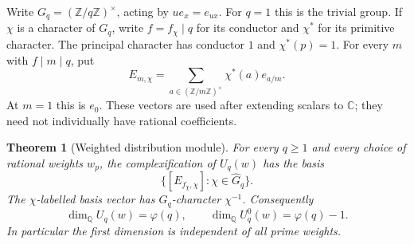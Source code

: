 \documentclass[11pt,a4paper]{article}
\newtheorem{theorem}{Theorem}[section]
\theoremstyle{definition}
\theoremstyle{remark}
\numberwithin{equation}{section}
\begin{document}
Write $G_q=(\mathbb Z/q\mathbb Z)^\times$, acting by $u e_x=e_{ux}$.
For $q=1$ this is the trivial group.  If $\chi$ is a character of $G_q$,
write $f=f_\chi\mid q$ for its conductor and $\chi^*$ for its primitive
character.  The principal character has conductor $1$ and
$\chi^*(p)=1$.  For every $m$ with $f\mid m\mid q$, put
\begin{equation}\label{rank:E}
 E_{m,\chi}=
 \sum_{a\in(\mathbb Z/m\mathbb Z)^\times}
       \chi^*(a)e_{a/m}.
\end{equation}
At $m=1$ this is $e_0$.  These vectors are used after extending scalars to
$\mathbb C$; they need not individually have rational coefficients.

\begin{theorem}[Weighted distribution module]\label{rank:main}
For every $q\geq1$ and every choice of rational weights $w_p$, the
complexification of $U_q(w)$ has the basis
\[
 \bigl\{[E_{f_\chi,\chi}]:\chi\in\widehat G_q\bigr\}.
\]
The $\chi$-labelled basis vector has $G_q$-character $\chi^{-1}$.
Consequently
\begin{equation}\label{rank:dimensions}
 \dim_{\mathbb Q} U_q(w)=\varphi(q),
 \qquad
 \dim_{\mathbb Q} U_q^0(w)=\varphi(q)-1.
\end{equation}
In particular the first dimension is independent of all prime weights.
\end{theorem}
\end{document}
